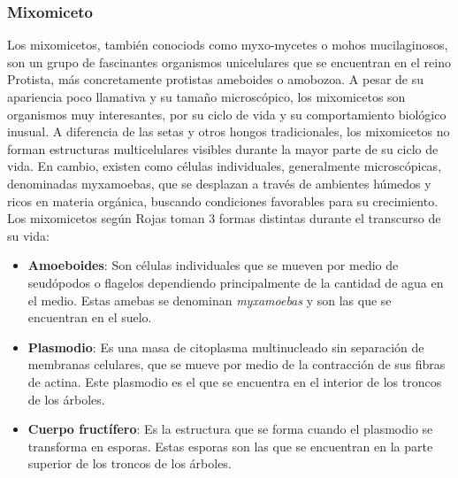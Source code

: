 \subsubsection{Mixomiceto}
    Los mixomicetos, tambi\'en conociods como myxo-mycetes o mohos mucilaginosos, son 
        un grupo de fascinantes organismos unicelulares que se encuentran en el reino Protista, m\'as concretamente
        protistas ameboides o amobozoa.
        A pesar de su apariencia poco llamativa y su tama\~no microsc\'opico,
        los mixomicetos son organismos muy interesantes, por su ciclo de vida y su comportamiento
        biol\'ogico inusual.
    \vskip 0.5cm
    A diferencia de las setas y otros hongos tradicionales, los mixomicetos no forman estructuras 
        multicelulares visibles durante la mayor parte de su ciclo de vida. En cambio, existen como 
        c\'elulas individuales, generalmente microsc\'opicas, denominadas myxamoebas, que se desplazan a
        trav\'es de ambientes h\'umedos y ricos en materia org\'anica, buscando condiciones favorables para su crecimiento.\cite{Rojas2017}
    \vskip 0.5cm
    Los mixomicetos seg\'un Rojas \cite{Rojas2017} toman 3 formas distintas durante el transcurso de su vida: 
    \begin{itemize}
        \item \textbf{Amoeboides}: Son c\'elulas individuales que se mueven por medio de 
            seud\'opodos o flagelos dependiendo principalmente de la cantidad de agua en el medio.
            Estas amebas se denominan \textit{myxamoebas} y son las que se encuentran en el suelo.
        \item \textbf{Plasmodio}: Es una masa de citoplasma multinucleado sin separaci\'on de 
            membranas celulares, que se mueve por medio de la contracci\'on de sus fibras de actina.
            Este plasmodio es el que se encuentra en el interior de los troncos de los \'arboles.
        \item \textbf{Cuerpo fruct\'ifero}: Es la estructura que se forma cuando el plasmodio 
            se transforma en esporas. Estas esporas son las que se encuentran en la parte superior 
            de los troncos de los \'arboles.
    \end{itemize}
    \vskip 0.5cm
